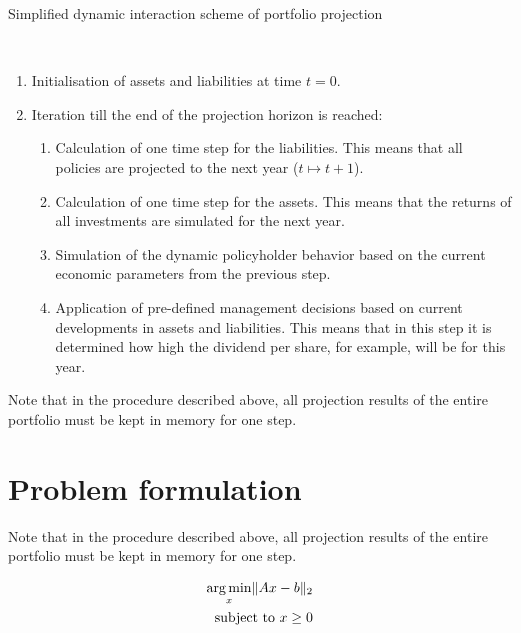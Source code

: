 \begin{algorithm}
	\caption{Simplified dynamic interaction scheme of portfolio projection}\label{alg:interaction}
	\begin{algorithmic}
		\\
		\begin{enumerate}
			\item Initialisation of assets and liabilities at time $t = 0$.
			\item  Iteration till the end of the projection horizon is reached:
			\begin{enumerate}[label=\emph{\alph*})]
				\item Calculation of one time step for the liabilities. This means that all policies are projected to the next year ($t \mapsto t+1$). 
				\item Calculation of one time step for the assets. This means that the returns of all investments are simulated for the next year.
				\item Simulation of the dynamic policyholder behavior based on the current economic parameters from the previous step.
				\item Application of pre-defined management decisions based on current developments in assets and liabilities. This means that in this step it is determined how high the dividend per share, for example, will be for this year. 
			\end{enumerate}
		\end{enumerate}
	\end{algorithmic}
\end{algorithm}

Note that in the procedure described above, all projection results of the entire portfolio must be kept in memory for one step.

\section{Problem formulation}
Note that in the procedure described above, all projection results of the entire portfolio must be kept in memory for one step.

\begin{align*}
\operatorname*{arg\,min}_x \lVert Ax -b \rVert_2 \\
\text{subject to } x \geq 0
\end{align*}



